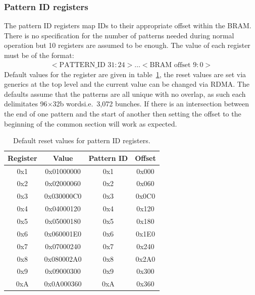 \subsubsection{Pattern ID registers} %
\label{sub:pattern_id_registers}
The pattern ID registers map IDs to their appropriate offset within the BRAM. There is no specification for the number of patterns needed during normal operation but 10 registers are assumed to be enough. The value of each register must be of the format:
\begin{align} \label{fmt:pattern_id}
  <\text{PATTERN\_ID } 31:24>\ldots<\text{BRAM offset } 9:0> 
\end{align}
Default values for the register are given in table~\ref{tab:default_pattern_id_reg}, the reset values are set via generics at the top level and the current value can be changed via RDMA. The defaults assume that the patterns are all unique with no overlap, as such each delimitates 96\( \times \)32b wordsi.e.\  3,072 bunches. If there is an intersection between the end of one pattern and the start of another then setting the offset to the beginning of the common section will work as expected.
\begin{table}[htbp]
  \begin{center}
    \begin{tabular}{c|c|c|c}
      Register & Value      & Pattern ID & Offset \\
      \hline
      0x1      & 0x01000000 & 0x1        & 0x000  \\ 
      0x2      & 0x02000060 & 0x2        & 0x060  \\  
      0x3      & 0x030000C0 & 0x3        & 0x0C0  \\ 
      0x4      & 0x04000120 & 0x4        & 0x120  \\ 
      0x5      & 0x05000180 & 0x5        & 0x180  \\ 
      0x6      & 0x060001E0 & 0x6        & 0x1E0  \\ 
      0x7      & 0x07000240 & 0x7        & 0x240  \\ 
      0x8      & 0x080002A0 & 0x8        & 0x2A0  \\ 
      0x9      & 0x09000300 & 0x9        & 0x300  \\ 
      0xA      & 0x0A000360 & 0xA        & 0x360  \\ 
    \end{tabular}
  \end{center}
  \caption{Default reset values for pattern ID registers.}
  \label{tab:default_pattern_id_reg}
\end{table}
